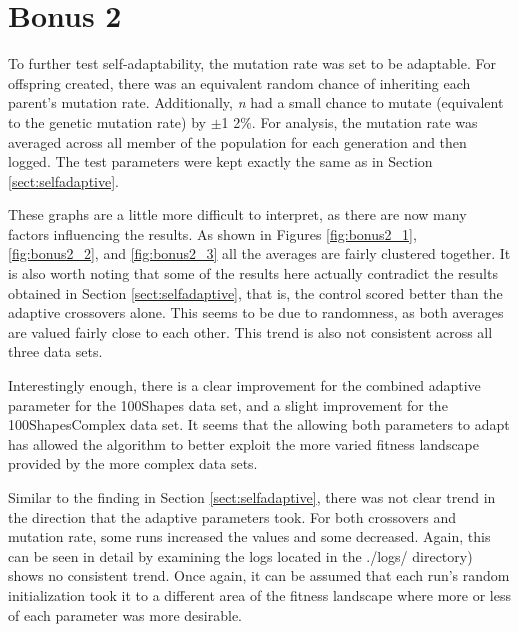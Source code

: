 \documentclass[11pt]{article}
\begin{document}
\section{Bonus 2}\label{sect:bonus2}

To further test self-adaptability, the mutation rate was set to be adaptable. For offspring created, there was an equivalent random chance of inheriting each parent's mutation rate. Additionally, \textit{n} had a small chance to mutate (equivalent to the genetic mutation rate) by $\pm$1 2\%. For analysis, the mutation rate was averaged across all member of the population for each generation and then logged. The test parameters were kept exactly the same as in Section \ref{sect:selfadaptive}.

These graphs are a little more difficult to interpret, as there are now many factors influencing the results. As shown in Figures \ref{fig:bonus2_1}, \ref{fig:bonus2_2}, and \ref{fig:bonus2_3} all the averages are fairly clustered together. It is also worth noting that some of the results here actually contradict the results obtained in Section \ref{sect:selfadaptive}, that is, the control scored better than the adaptive crossovers alone. This seems to be due to randomness, as both averages are valued fairly close to each other. This trend is also not consistent across all three data sets.

Interestingly enough, there is a clear improvement for the combined adaptive parameter for the 100Shapes data set, and a slight improvement for the 100ShapesComplex data set. It seems that the allowing both parameters to adapt has allowed the algorithm to better exploit the more varied fitness landscape provided by the more complex data sets.

Similar to the finding in Section \ref{sect:selfadaptive}, there was not clear trend in the direction that the adaptive parameters took. For both crossovers and mutation rate, some runs increased the values and some decreased. Again, this can be seen in detail by examining the logs located in the ./logs/ directory) shows no consistent trend. Once again, it can be assumed that each run's random initialization took it to a different area of the fitness landscape where more or less of each parameter was more desirable.
\end{document}
